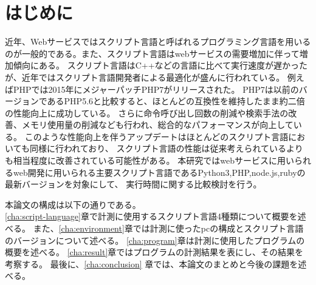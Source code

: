 \chapter{はじめに}
\label{cha:intro}
近年、Webサービスではスクリプト言語と呼ばれるプログラミング言語を用いるのが一般的である。また、スクリプト言語はwebサービスの需要増加に伴って増加傾向にある。
スクリプト言語はC++などの言語に比べて実行速度が遅かったが、近年ではスクリプト言語開発者による最適化が盛んに行われている。
例えばPHPでは2015年にメジャーパッチPHP7\cite{PHPchange}がリリースされた。
PHP7は以前のバージョンであるPHP5.6と比較すると、ほとんどの互換性を維持したまま約二倍の性能向上に成功している。
さらに命令呼び出し回数の削減や検索手法の改善、メモリ使用量の削減なども行われ、総合的なパフォーマンスが向上している。
このような性能向上を伴うアップデートはほとんどのスクリプト言語においても同様に行われており、
スクリプト言語の性能は従来考えられているよりも相当程度に改善されている可能性がある。
本研究ではwebサービスに用いられるweb開発に用いられる主要スクリプト言語であるPython3,PHP,node.js,rubyの最新バージョンを対象にして、
実行時間に関する比較検討を行う。

本論文の構成は以下の通りである。\\
\ref{cha:script-language}章で計測に使用するスクリプト言語4種類について概要を述べる。
また、\ref{cha:environment}章では計測に使ったpcの構成とスクリプト言語のバージョンについて述べる。
\ref{cha:program}章は計測に使用したプログラムの概要を述べる。
\ref{cha:result}章ではプログラムの計測結果を表にし、その結果を考察する。
最後に、\ref{cha:conclusion} 章では、本論文のまとめと今後の課題を述べる。